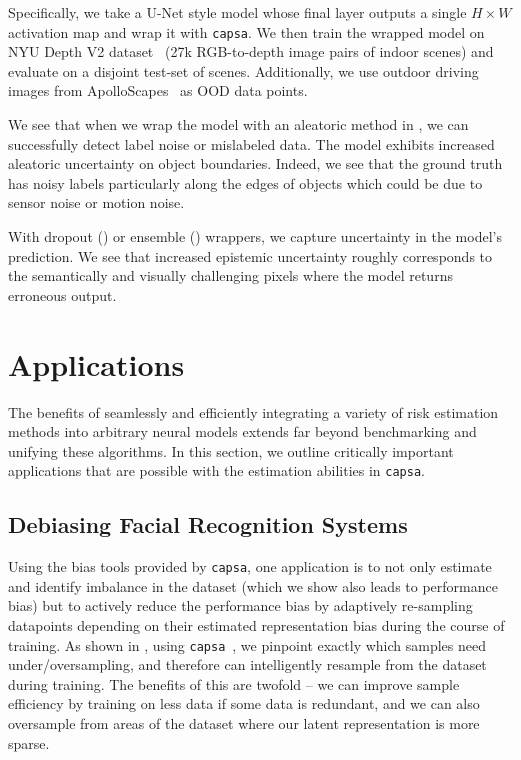 \documentclass{article} %
\def\capsa{\texttt{{capsa}}}
\newcommand{\note}[1]{\textcolor{blue}{[\textbf{NOTE}: #1]}}
\begin{document}
Specifically, we take a U-Net style model whose final layer outputs a single $H \times W$ activation map and wrap it with \capsa. We then train the wrapped model on NYU Depth V2 dataset~\citep{Silberman:ECCV12} (27k RGB-to-depth image pairs of indoor scenes) and evaluate on a disjoint test-set of scenes. Additionally, we use outdoor driving images from ApolloScapes~\citep{liao2020dvi} as OOD data points.



We see that when we wrap the model with an aleatoric method in ,  we can successfully detect label noise or mislabeled data. The model exhibits increased aleatoric uncertainty on object boundaries. Indeed, we see that the ground truth has noisy labels particularly along the edges of objects which could be due to sensor noise or motion noise.

With dropout () or ensemble () wrappers, we capture uncertainty in the model's prediction. We see that increased epistemic uncertainty roughly corresponds to the semantically and visually challenging pixels where the model returns erroneous output.

\section{Applications}
The benefits of seamlessly and efficiently integrating a variety of risk estimation methods into arbitrary neural models extends far beyond benchmarking and unifying these algorithms. In this section, we outline critically important applications that are possible with the estimation abilities in \capsa.

\subsection{Debiasing Facial Recognition Systems}

Using the bias tools provided by \capsa, one application is to not only estimate and identify imbalance in the dataset (which we show also leads to performance bias) but to actively reduce the performance bias by adaptively re-sampling datapoints depending on their estimated representation bias during the course of training. As shown in , using \capsa~, we pinpoint exactly which samples need under/oversampling, and therefore can intelligently resample from the dataset during training. The benefits of this are twofold -- we can improve sample efficiency by training on less data if some data is redundant, and we can also oversample from areas of the dataset where our latent representation is more sparse. 
\end{document}
